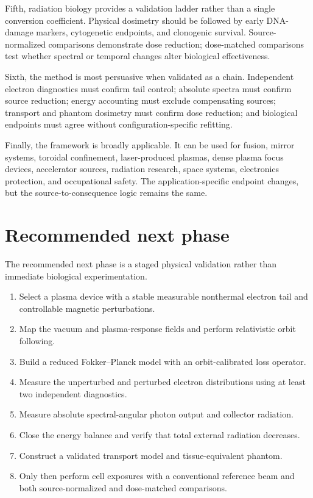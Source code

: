 Fifth, radiation biology provides a validation ladder rather than a single conversion coefficient. Physical dosimetry should be followed by early DNA-damage markers, cytogenetic endpoints, and clonogenic survival. Source-normalized comparisons demonstrate dose reduction; dose-matched comparisons test whether spectral or temporal changes alter biological effectiveness.

Sixth, the method is most persuasive when validated as a chain. Independent electron diagnostics must confirm tail control; absolute spectra must confirm source reduction; energy accounting must exclude compensating sources; transport and phantom dosimetry must confirm dose reduction; and biological endpoints must agree without configuration-specific refitting.

Finally, the framework is broadly applicable. It can be used for \pB fusion, mirror systems, toroidal confinement, laser-produced plasmas, dense plasma focus devices, accelerator sources, radiation research, space systems, electronics protection, and occupational safety. The application-specific endpoint changes, but the source-to-consequence logic remains the same.

\section{Recommended next phase}

The recommended next phase is a staged physical validation rather than immediate biological experimentation.

\begin{enumerate}
\item Select a plasma device with a stable measurable nonthermal electron tail and controllable magnetic perturbations.
\item Map the vacuum and plasma-response fields and perform relativistic orbit following.
\item Build a reduced Fokker--Planck model with an orbit-calibrated loss operator.
\item Measure the unperturbed and perturbed electron distributions using at least two independent diagnostics.
\item Measure absolute spectral-angular photon output and collector radiation.
\item Close the energy balance and verify that total external radiation decreases.
\item Construct a validated transport model and tissue-equivalent phantom.
\item Only then perform cell exposures with a conventional reference beam and both source-normalized and dose-matched comparisons.
\end{enumerate}

